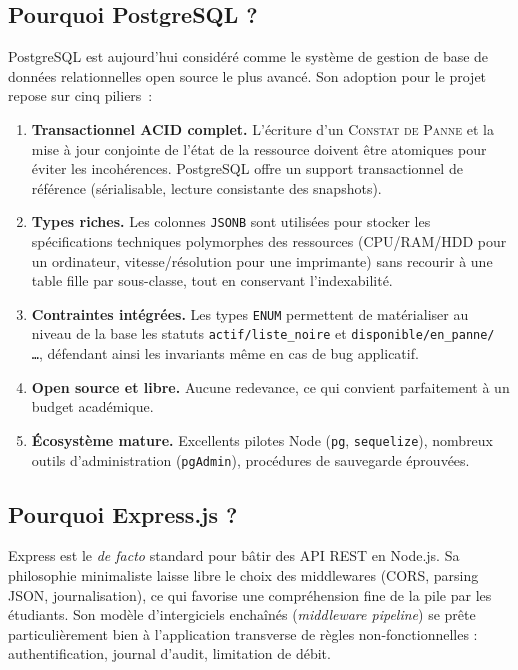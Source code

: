 \documentclass[a4paper,11pt,openany]{report}
\newcommand{\constat}{\textsc{Constat de Panne}}
\begin{document}
\subsection{Pourquoi PostgreSQL ?}

PostgreSQL est aujourd'hui considéré comme le système de gestion
de base de données relationnelles open source le plus avancé.
Son adoption pour le projet repose sur cinq piliers~:

\begin{enumerate}
  \item \textbf{Transactionnel ACID complet.} L'écriture d'un
    \constat{} et la mise à jour conjointe de l'état de la
    ressource doivent être atomiques pour éviter les
    incohérences. PostgreSQL offre un support transactionnel de
    référence (sérialisable, lecture consistante des snapshots).
  \item \textbf{Types riches.} Les colonnes \texttt{JSONB} sont
    utilisées pour stocker les spécifications techniques
    polymorphes des ressources (CPU/RAM/HDD pour un ordinateur,
    vitesse/résolution pour une imprimante) sans recourir à une
    table fille par sous-classe, tout en conservant
    l'indexabilité.
  \item \textbf{Contraintes intégrées.} Les types \texttt{ENUM}
    permettent de matérialiser au niveau de la base les statuts
    \texttt{actif/liste\_noire} et \texttt{disponible/en\_panne/
    \ldots}, défendant ainsi les invariants même en cas de bug
    applicatif.
  \item \textbf{Open source et libre.} Aucune redevance, ce qui
    convient parfaitement à un budget académique.
  \item \textbf{Écosystème mature.} Excellents pilotes Node
    (\texttt{pg}, \texttt{sequelize}), nombreux outils
    d'administration (\texttt{pgAdmin}), procédures de
    sauvegarde éprouvées.
\end{enumerate}

\subsection{Pourquoi Express.js ?}

Express est le \emph{de facto} standard pour bâtir des API REST
en Node.js. Sa philosophie minimaliste laisse libre le choix des
middlewares (CORS, parsing JSON, journalisation), ce qui
favorise une compréhension fine de la pile par les étudiants.
Son modèle d'intergiciels enchaînés (\emph{middleware pipeline})
se prête particulièrement bien à l'application transverse de
règles non-fonctionnelles : authentification, journal d'audit,
limitation de débit.
\end{document}
